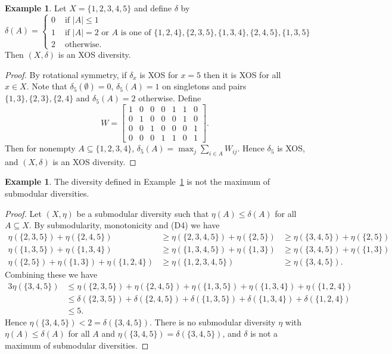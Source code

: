 \documentclass{article}
\theoremstyle{plain}
\theoremstyle{definition}
\newtheorem{example}[theorem]{Example}
\begin{document}
\begin{example} \label{ex:XOS}
Let $X = \{1,2,3,4,5\}$ and define $\delta$ by 
\[\delta(A) = \begin{cases} 0 & \mbox{ if $|A| \leq 1$ }\\
1 & \mbox{ if $|A| = 2$ or $A$ is one of $\{1,2,4\},\{2,3,5\},\{1,3,4\},\{2,4,5\},\{1,3,5\}$ } \\
2 & \mbox{ otherwise.}  \end{cases} \]
Then $(X,\delta)$ is an XOS diversity.
\end{example}
\begin{proof}
By rotational symmetry, if $\delta_x$ is XOS for $x = 5$ then it is XOS for all $x \in X$. Note that $\delta_5(\emptyset) = 0$, $\delta_5(A) = 1$ on singletons and pairs $\{1,3\},\{2,3\},\{2,4\}$ and $\delta_5(A) = 2$ otherwise. Define
\[W = \left[ \begin{matrix} %
1 & 0 & 0 & 0 & 1 & 1 & 0\\
0 & 1 & 0 & 0 & 0 & 1 & 0\\
0 & 0 & 1 & 0 & 0 & 0 & 1\\
0 & 0 & 0 & 1 & 1 & 0 & 1
\end{matrix} \right].\]
Then for nonempty $A \subseteq \{1,2,3,4\}$, $\delta_5(A) = \max_j \sum_{i \in A} W_{ij}$. Hence $\delta_5$ is XOS, and $(X,\delta)$ is an XOS diversity.
\end{proof}

\begin{example}
The diversity defined in Example~\ref{ex:XOS} is not the maximum of submodular diversities.
\end{example}
\begin{proof}
Let $(X,\eta)$ be a submodular diversity such that $\eta(A) \leq \delta(A)$ for all $A \subseteq X$. By submodularity, monotonicity and (D4) we have 
\begin{equation*}
\begin{array}{rcl}
\eta(\{2,3,5\}) + \eta(\{2,4,5\}) &\geq \eta(\{2,3,4,5\}) + \eta(\{2,5\}) & \geq \eta(\{3,4,5\}) + \eta(\{2,5\}) \\
\eta(\{1,3,5\}) + \eta(\{1,3,4\}) &\geq \eta(\{1,3,4,5\}) + \eta(\{1,3\}) & \geq \eta(\{3,4,5\}) + \eta(\{1,3\}) \\
\eta(\{2,5\}) + \eta(\{1,3\}) + \eta(\{1,2,4\}) & \geq \eta(\{1,2,3,4,5\}) & \geq \eta(\{3,4,5\}).
\end{array}
\end{equation*}
Combining these we have
\begin{align*}
3 \eta(\{3,4,5\}) & \leq \eta(\{2,3,5\}) + \eta(\{2,4,5\}) + \eta(\{1,3,5\}) + \eta(\{1,3,4\}) + \eta(\{1,2,4\}) \\
& \leq  \delta(\{2,3,5\}) + \delta(\{2,4,5\}) + \delta(\{1,3,5\}) + \delta(\{1,3,4\}) + \delta(\{1,2,4\}) \\
& \leq 5.
\end{align*}
Hence $\eta(\{3,4,5\}) < 2 = \delta(\{3,4,5\})$. There is no submodular diversity $\eta$ with $\eta(A) \leq \delta(A)$ for all $A$ and $\eta(\{3,4,5\}) = \delta(\{3,4,5\})$, and $\delta$ is not a maximum of submodular diversities.
\end{proof}
\end{document}

